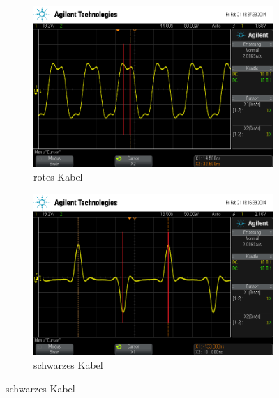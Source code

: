 \begin{figure}
  \centering

  \begin{subfigure}{0.4\textwidth}
    \includegraphics[width=\textwidth]{laenge_rot.png}
    \caption{rotes Kabel}
    \label{fig:laenge_rot}
  \end{subfigure}
  \quad
  \begin{subfigure}{0.4\textwidth}
    \includegraphics[width=\textwidth]{laenge_schwarz.png}
    \caption{schwarzes Kabel}
    \label{fig:laenge_schwarz}
  \end{subfigure}


\end{figure}
